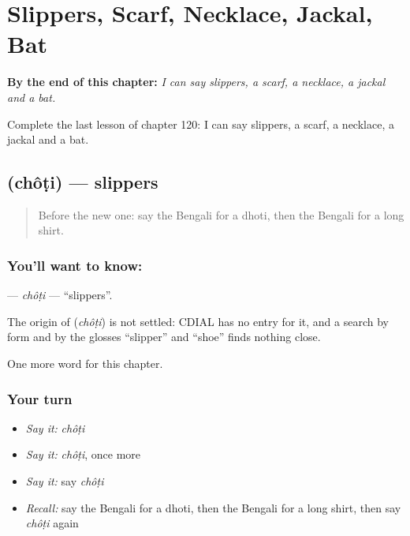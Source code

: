 
\chapter{Slippers, Scarf, Necklace, Jackal, Bat}
\label{ch:bn-slippers-scarf-necklace-jackal-bat}

\begin{chapteropening}
\textbf{By the end of this chapter:} \emph{I can say slippers, a scarf, a necklace, a jackal and a bat.}

Complete the last lesson of chapter 120: I can say slippers, a scarf, a necklace, a jackal and a bat.
\end{chapteropening}

\section[\texorpdfstring{\bn{চটি} (chôṭi)}{চটি (chôṭi)}]{ (chôṭi) — slippers}

\label{lesson:BN-C120-choti}



\begin{quote}
Before the new one: say the Bengali for a dhoti, then the Bengali for a long shirt.
\end{quote}

\subsection*{You'll want to know: }
\textbf{} — \emph{chôṭi} — \textquotedblleft{}slippers\textquotedblright{}.

\begin{cousinweb}
The origin of \textbf{} (\emph{chôṭi}) is not settled: CDIAL has no entry for it, and a search by form and by the glosses \textquotedblleft{}slipper\textquotedblright{} and \textquotedblleft{}shoe\textquotedblright{} finds nothing close.
\end{cousinweb}

\begin{grammarlens}[title={What you've built}]
One more word for this chapter.
\end{grammarlens}

\subsection*{Your turn}
\begin{itemize}
\raggedright
  \item \emph{Say it:} \emph{chôṭi}
  \item \emph{Say it:} \emph{chôṭi}, once more
  \item \emph{Say it:} say \emph{chôṭi}
  \item \emph{Recall:} say the Bengali for a dhoti, then the Bengali for a long shirt, then say \emph{chôṭi} again
\end{itemize}

